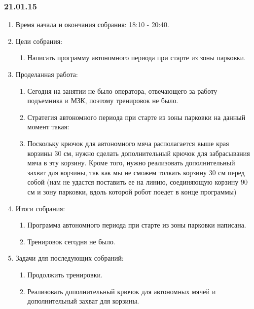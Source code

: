 \subsubsection{21.01.15}
\begin{enumerate}
	
	\item Время начала и окончания собрания: 18:10 - 20:40.
	
	\item Цели собрания: 
	\begin{enumerate}
		
		\item Написать программу автономного периода при старте из зоны парковки.
		
	\end{enumerate}

	\item Проделанная работа:
	\begin{enumerate}
		
		\item Сегодня на занятии не было оператора, отвечающего за работу подъемника и МЗК, поэтому тренировок не было.
		
		\item Стратегия автономного периода при старте из зоны парковки на данный момент такая:
		
        \item Поскольку крючок для автономного мяча располагается выше края корзины 30 см, нужно сделать дополнительный крючок для забрасывания мяча в эту корзину. Кроме того, нужно реализовать дополнительный захват для корзины, так как мы не сможем толкать корзину 30 см перед собой (нам не удастся поставить ее на линию, соединяющую корзину 90 см и зону парковки, вдоль которой робот поедет в конце программы)
		
	\end{enumerate}
	
	\item Итоги собрания:
	\begin{enumerate}
		
		\item Программа автономного периода при старте из зоны парковки написана.
		
		\item Тренировок сегодня не было.
		
	\end{enumerate}
	
	\item Задачи для последующих собраний:
	\begin{enumerate}
		
		\item Продолжить тренировки.
		
		\item Реализовать дополнительный крючок для автономных мячей и дополнительный захват для корзины.
			
	\end{enumerate}
\end{enumerate}
\fillpage
